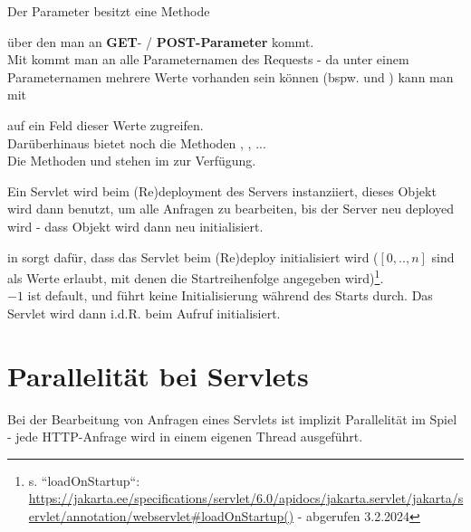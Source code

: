 \noindent
Der Parameter  besitzt eine Methode \begin{center}\end{center} über den man an \textbf{GET}- / \textbf{POST-Parameter} kommt.\\

\noindent
Mit  kommt man an alle Parameternamen des Requests - da unter einem Parameternamen mehrere Werte vorhanden sein können  (bspw.  und ) kann man mit \begin{center}\end{center} auf ein Feld dieser Werte zugreifen.\\

\noindent
Darüberhinaus bietet  noch die Methoden , , ...\\

\noindent
Die Methoden  und  stehen im  zur Verfügung.

\noindent
Ein Servlet wird beim (Re)deployment des Servers instanziiert, dieses Objekt wird  dann benutzt, um alle Anfragen zu bearbeiten, bis der Server neu deployed wird -  dass Objekt wird dann neu initialisiert.

\begin{tcolorbox}[enlarge top by=0.5cm,enlarge bottom by=0.5cm]
     in  sorgt dafür, dass das Servlet beim (Re)deploy initialisiert wird ($[0, .., n]$ sind als Werte erlaubt, mit denen die Startreihenfolge angegeben wird)\footnote{
        s. ``loadOnStartup``: \url{https://jakarta.ee/specifications/servlet/6.0/apidocs/jakarta.servlet/jakarta/servlet/annotation/webservlet#loadOnStartup()} - abgerufen 3.2.2024
    }.\\
    $-1$ ist default, und führt keine Initialisierung während des Starts durch.
    Das Servlet wird dann i.d.R. beim Aufruf initialisiert.
\end{tcolorbox}


\section{Parallelität bei Servlets}

Bei der Bearbeitung von Anfragen eines Servlets ist implizit Parallelität im Spiel - jede HTTP-Anfrage wird in einem eigenen Thread ausgeführt.

